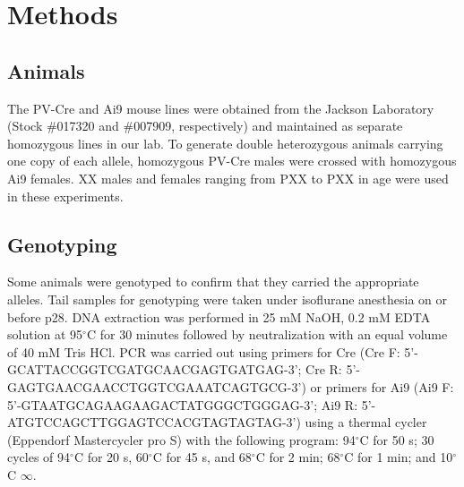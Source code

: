 \section{Methods}
\subsection{Animals} The PV-Cre and Ai9 mouse lines were obtained from the Jackson Laboratory (Stock \#017320 and \#007909, respectively) and maintained as separate homozygous lines in our lab.  To generate double heterozygous animals carrying one copy of each allele, homozygous PV-Cre males were crossed with homozygous Ai9 females. XX males and females ranging from PXX to PXX in age were used in these experiments. 

\subsection{Genotyping} Some animals were genotyped to confirm that they carried the appropriate alleles. Tail samples for genotyping were taken under isoflurane anesthesia on or before p28.  DNA extraction was performed in 25 mM NaOH, 0.2 mM EDTA solution at 95$^\circ$C for 30 minutes followed by neutralization with an equal volume of 40 mM Tris HCl.  PCR was carried out using primers for Cre (Cre F: 5'-GCATTA\-CCG\-GTC\-GAT\-GCA\-ACG\-AGT\-GATGAG-3'; Cre R: 5'-GAGTGA\-ACG\-AAC\-CTG\-GTC\-GAA\-ATC\-AGTGCG-3') or primers for Ai9 (Ai9 F: 5'-GTAATG\-CAG\-AAG\-AAG\-ACT\-ATG\-GGC\-TGGGAG-3'; Ai9 R: 5'-ATGTCC\-AGC\-TTG\-GAG\-TCC\-ACG\-TAG\-TAGTAG-3') using a thermal cycler (Eppendorf Mastercycler pro S) with the following program: 94$^\circ$C for 50 s; 30 cycles of 94$^\circ$C for 20 s, 60$^\circ$C for 45 s, and 68$^\circ$C for 2 min; 68$^\circ$C for 1 min; and 10$^\circ$C $\infty$.

